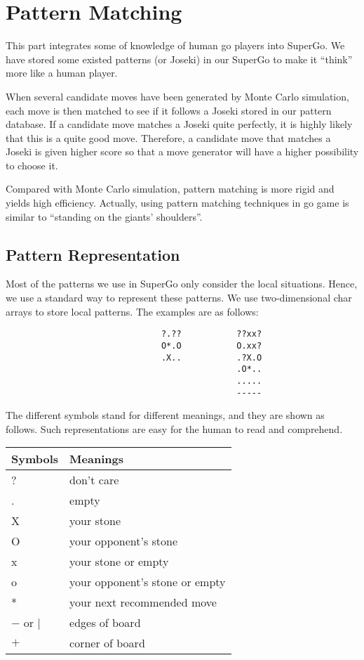 \section{Pattern Matching}

This part integrates some of knowledge of human go players into SuperGo. We have stored some existed patterns (or Joseki) in our SuperGo to make it ``think'' more like a human player. 

When several candidate moves have been generated by Monte Carlo simulation, each move is then matched to see if it follows a Joseki stored in our pattern database. If a candidate move matches a Joseki quite perfectly, it is highly likely that this is a quite good move. Therefore, a candidate move that matches a Joseki is given higher score so that a move generator will have a higher possibility to choose it.

Compared with Monte Carlo simulation, pattern matching is more rigid and yields high efficiency. Actually, using pattern matching techniques in go game is similar to ``standing on the giants' shoulders''.

\subsection{Pattern Representation}

Most of the patterns we use in SuperGo only consider the local situations. Hence, we use a standard way to represent these patterns. We use two-dimensional char arrays to store local patterns. The examples are as follows:

\begin{verbatim}
                               ?.??           ??xx?
                               O*.O           O.xx?
                               .X..           .?X.O
                                              .O*..
                                              .....
                                              -----
\end{verbatim}

The different symbols stand for different meanings, and they are shown as follows. Such representations are easy for the human to read and comprehend.

\begin{center}
\begin{tabular}{l|l}
\textbf{Symbols} & \textbf{Meanings} \\ \hline
? & don't care \\
. & empty \\
X & your stone \\
O & your opponent's stone \\
x & your stone or empty \\
o & your opponent's stone or empty \\
* & your next recommended move \\
$-$ or $\mid$ & edges of board \\
$+$ & corner of board \\
\end{tabular}
\end{center}

